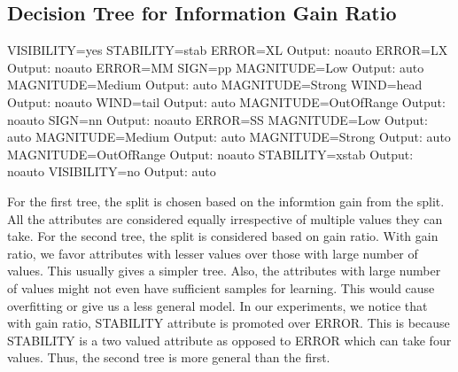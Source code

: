 \documentclass[]{article}   %
\begin{document}
\subsection{Decision Tree for Information Gain Ratio}
\begin{verbatimtab}[8]
  VISIBILITY=yes
    STABILITY=stab
      ERROR=XL
        Output: noauto
      ERROR=LX
        Output: noauto
      ERROR=MM
        SIGN=pp
          MAGNITUDE=Low
            Output: auto
          MAGNITUDE=Medium
            Output: auto
          MAGNITUDE=Strong
            WIND=head
              Output: noauto
            WIND=tail
              Output: auto
          MAGNITUDE=OutOfRange
            Output: noauto
        SIGN=nn
          Output: noauto
      ERROR=SS
        MAGNITUDE=Low
          Output: auto
        MAGNITUDE=Medium
          Output: auto
        MAGNITUDE=Strong
          Output: auto
        MAGNITUDE=OutOfRange
          Output: noauto
    STABILITY=xstab
      Output: noauto
  VISIBILITY=no
    Output: auto
\end{verbatimtab}
For the first tree, the split is chosen based on the informtion gain from the split. All the attributes are considered equally irrespective of multiple values they can take. For the second tree, the split is considered based on gain ratio. With gain ratio, we favor attributes with lesser values over those with large number of values. This usually gives a simpler tree. Also, the attributes with large number of values might not even have sufficient samples for learning. This would cause overfitting or give us a less general model. In our experiments, we notice that with gain ratio, STABILITY attribute is promoted over ERROR. This is because STABILITY is a two valued attribute as opposed to ERROR which can take four values. Thus, the second tree is more general than the first.
\end{document}
